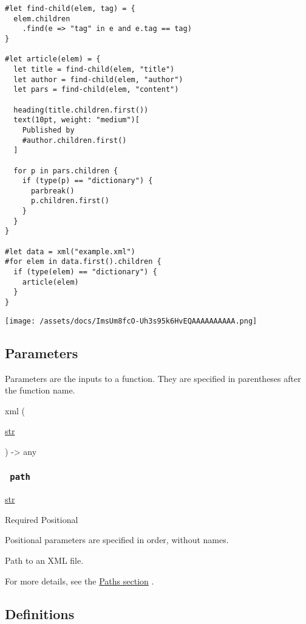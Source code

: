 \begin{verbatim}
#let find-child(elem, tag) = {
  elem.children
    .find(e => "tag" in e and e.tag == tag)
}

#let article(elem) = {
  let title = find-child(elem, "title")
  let author = find-child(elem, "author")
  let pars = find-child(elem, "content")

  heading(title.children.first())
  text(10pt, weight: "medium")[
    Published by
    #author.children.first()
  ]

  for p in pars.children {
    if (type(p) == "dictionary") {
      parbreak()
      p.children.first()
    }
  }
}

#let data = xml("example.xml")
#for elem in data.first().children {
  if (type(elem) == "dictionary") {
    article(elem)
  }
}
\end{verbatim}

\texttt{[image: /assets/docs/ImsUm8fcO-Uh3s95k6HvEQAAAAAAAAAA.png]}

\subsection{\texorpdfstring{{ Parameters
}}{ Parameters }}\label{parameters}

\label{parameters-tooltip}
Parameters are the inputs to a function. They are specified in
parentheses after the function name.

{ xml } (

{ \href{/docs/reference/foundations/str/}{str} }

) -\textgreater{} { any }

\subsubsection{\texorpdfstring{\texttt{\ path\ }}{ path }}\label{parameters-path}

\href{/docs/reference/foundations/str/}{str}

{Required} {{ Positional }}

\label{parameters-path-positional-tooltip}
Positional parameters are specified in order, without names.

Path to an XML file.

For more details, see the \href{/docs/reference/syntax/\#paths}{Paths
section} .

\subsection{\texorpdfstring{{ Definitions
}}{ Definitions }}\label{definitions}

